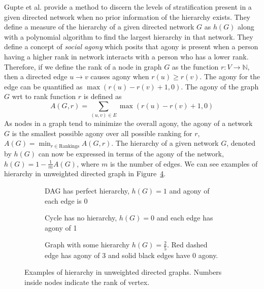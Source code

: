 Gupte et al. \cite{gupte2011finding} provide a method to discern the levels of stratification present in a given directed network when no prior information of the hierarchy exists. They define a measure of the hierarchy of a given directed network $G$ as $h(G)$ along with a polynomial algorithm to find the largest hierarchy in that network. They define a concept of \textit{social agony} which posits that agony is present when a person having a higher rank in network interacts with a person who has a lower rank. Therefore, if we define the rank of a node in graph $G$ as the function $r:V \rightarrow \mathbb{N}$, then a directed edge $u \rightarrow v$ causes agony when $r(u)\geq r(v)$. The agony for the edge can be quantified as $\max(r(u)-r(v)+1,0)$. The agony of the graph $G$ wrt to rank function $r$ is defined as 
\[A(G,r) =  \sum_{(u,v)\in E} \max(r(u)-r(v)+1,0)\]
As nodes in a graph tend to minimize the overall agony, the agony of a network $G$ is the smallest possible agony over all possible ranking for $r$, $A(G) = \min_{r\in \text{Rankings}}A(G,r)$. The hierarchy of a given network $G$, denoted by $h(G)$ can now be expressed in terms of the agony of the network, $h(G)=1-\frac{1}{m}A(G)$, where $m$ is the number of edges. We can see examples of hierarchy in unweighted directed graph in Figure~\ref{fig:hierarchy}.

 
\begin{figure}[!ht]
    \centering
    \begin{subfigure}[t]{0.5\textwidth}
        \centering
        
        \caption{DAG has perfect hierarchy, $h(G)=1$ and agony of each edge is 0}
        \label{fig:dag}
    \end{subfigure}

    \begin{subfigure}[t]{0.49\textwidth}
        \centering
        
        \caption{Cycle has no hierarchy, $h(G)=0$ and each edge has agony of 1}
        \label{fig:cycle}
    \end{subfigure}
    \begin{subfigure}[t]{0.49\textwidth}
        \centering
        
        \caption{Graph with some hierarchy $h(G)=\frac{2}{5}$. Red dashed edge has agony of 3 and solid black edges have 0 agony.  }
        \label{fig:some-hierarchy}
    \end{subfigure}
    \caption{Examples of hierarchy in unweighted directed graphs. Numbers inside nodes indicate the rank of vertex.}
    \label{fig:hierarchy} 
\end{figure}

